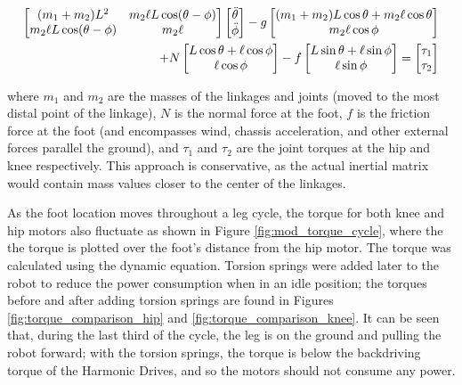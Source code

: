\begin{equation} \label{eq:dynamic_equation}
    \begin{split}
        \begin{bmatrix} 
            (m_1 + m_2) L^2 & m_2 \ell L \cos(\theta-\phi) \\
            m_2 \ell L \cos(\theta-\phi) & m_2 \ell
        \end{bmatrix}
        \begin{bmatrix} \Ddot{\theta} \\ \Ddot{\phi} \end{bmatrix}
        -
        g \begin{bmatrix}
            (m_1 + m_2) L \cos\theta + m_2 \ell \cos\theta \\
            m_2 \ell \cos\phi
        \end{bmatrix} \\
        +
        N \begin{bmatrix}
            L\cos\theta + \ell\cos\phi \\
            \ell\cos\phi
            \end{bmatrix} - f \begin{bmatrix}
            L\sin\theta + \ell\sin\phi \\
            \ell\sin\phi
        \end{bmatrix}
        =
        \begin{bmatrix}
        \tau_1 \\ \tau_2
        \end{bmatrix}
    \end{split}
\end{equation}

where $m_1$ and $m_2$ are the masses of the linkages and joints (moved to the most distal point of the linkage), $N$ is the normal force at the foot, $f$ is the friction force at the foot (and encompasses wind, chassis acceleration, and other external forces parallel the ground), and $\tau_1$ and $\tau_2$ are the joint torques at the hip and knee respectively.
This approach is conservative, as the actual inertial matrix would contain mass values closer to the center of the linkages.

As the foot location moves throughout a leg cycle, the torque for both knee and hip motors also fluctuate as shown in Figure \ref{fig:mod_torque_cycle}, where the the torque is plotted over the foot's distance from the hip motor. The torque was calculated using the dynamic equation.
Torsion springs were added later to the robot to reduce the power consumption when in an idle position; the torques before and after adding torsion springs are found in Figures \ref{fig:torque_comparison_hip} and \ref{fig:torque_comparison_knee}.
It can be seen that, during the last third of the cycle, the leg is on the ground and pulling the robot forward; with the torsion springs, the torque is below the backdriving torque of the Harmonic Drives, and so the motors should not consume any power.

